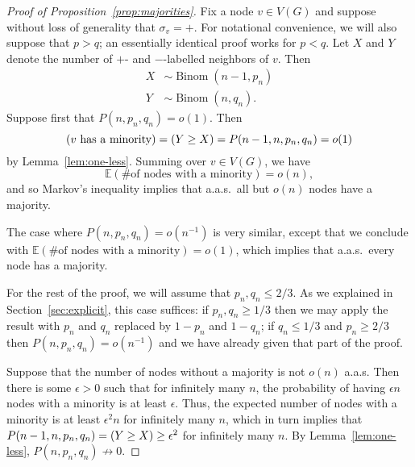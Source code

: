 \documentclass[EJP,final]{ejpecp}
\newcommand{\E}{\mathbb{E}}
\newcommand{\1}[1]{\mathbbm{1}_{\{#1\}}}
\let\Pr\relax
\DeclareMathOperator{\Pr}{Pr}
\DeclareMathOperator{\Binom}{Binom}
\begin{document}
\begin{proof}[Proof of Proposition~\ref{prop:majorities}]
  Fix a node $v \in V(G)$ and suppose without loss of generality
  that $\sigma_v = +$. For notational convenience, we will also suppose
  that $p > q$; an essentially identical proof works for $p < q$.
  Let $X$ and $Y$ denote the number of $+$- and $-$-labelled neighbors
  of $v$.
  Then
  \begin{align*}
   X &\sim \Binom(n-1, p_n) \\
   Y &\sim \Binom(n, q_n).
  \end{align*}
  Suppose first that $P(n, p_n, q_n) = o(1)$. Then
  \[
   \Pr(\text{$v$ has a minority}) = \Pr(Y \ge X) = P(n-1, n, p_n, q_n) = o(1)
  \]
  by Lemma~\ref{lem:one-less}.
  Summing over $v \in V(G)$, we have
  \[
   \E(\text{\# of nodes with a minority}) = o(n),
  \]
  and so Markov's inequality implies that a.a.s.\ all but $o(n)$ nodes
  have a majority.

  The case where $P(n, p_n, q_n) = o(n^{-1})$ is very similar, except that
  we conclude with
  $\E(\text{\# of nodes with a minority}) = o(1)$,
  which implies that a.a.s.\ every node has a majority.

  For the rest of the proof, we will assume that $p_n, q_n \le 2/3$. As
  we explained in Section~\ref{sec:explicit}, this case suffices: if
  $p_n, q_n \ge 1/3$ then we may apply the result with $p_n$
  and $q_n$ replaced by $1-p_n$ and $1 - q_n$; if $q_n \le 1/3$ and
  $p_n \ge 2/3$ then $P(n, p_n, q_n) = o(n^{-1})$ and we have already
  given that part of the proof.

  Suppose that the number of nodes without a majority is not $o(n)$ a.a.s.
  Then there is some $\epsilon > 0$ such that for infinitely many $n$,
  the probability of having $\epsilon n$ nodes with a minority is at least
  $\epsilon$. Thus, the expected number of nodes with a minority is at least
  $\epsilon^2 n$ for infinitely many $n$, which in turn implies that
  $P(n-1, n, p_n, q_n) = \Pr(Y \ge X) \ge \epsilon^2$ for infinitely many $n$. By
  Lemma~\ref{lem:one-less}, $P(n, p_n, q_n) \not \to 0$.


\end{proof}
\end{document}

